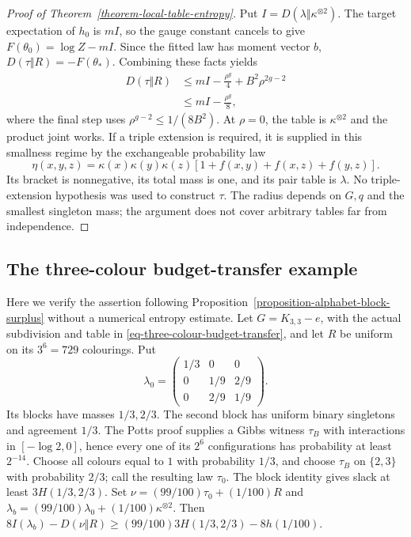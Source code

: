 \documentclass[a4paper,11pt,reqno]{amsart}
\theoremstyle{plain}
\theoremstyle{definition}
\theoremstyle{remark}
\begin{document}
\begin{proof}[Proof of Theorem~\ref{theorem-local-table-entropy}]
Put $I=D(\lambda\Vert\kappa^{\otimes2})$.
The target expectation of $h_0$ is $mI$, so the gauge constant cancels to
give $F(\theta_0)=\log Z-mI$.  Since the fitted law has moment vector $b$,
$D(\tau\Vert R)=-F(\theta_*)$.  Combining these facts yields
\[
 \begin{split}
 D(\tau\Vert R)
 &\le mI-\frac{\rho^g}{4}+B^2\rho^{2g-2}\\
 &\le mI-\frac{\rho^g}{8},
 \end{split}
\]
where the final step uses $\rho^{g-2}\le1/(8B^2)$.
At $\rho=0$, the table is $\kappa^{\otimes2}$ and the product joint works.
If a triple extension is required, it is supplied in this smallness regime
by the exchangeable probability law
\[
 \eta(x,y,z)=\kappa(x)\kappa(y)\kappa(z)
          [1+f(x,y)+f(x,z)+f(y,z)].
\]
Its bracket is nonnegative, its total mass is one, and its pair table is
$\lambda$.  No triple-extension hypothesis was used to construct $\tau$.
The radius depends on $G,q$ and the smallest singleton mass; the argument
does not cover arbitrary tables far from independence.
\end{proof}

\subsection*{The three-colour budget-transfer example}
Here we verify the assertion following
Proposition~\ref{proposition-alphabet-block-surplus} without a numerical
entropy estimate.  Let $G=K_{3,3}-e$, with the actual subdivision and table
in \eqref{eq-three-colour-budget-transfer}, and let $R$ be uniform on its
$3^6=729$ colourings.  Put
\[
 \lambda_0=\begin{pmatrix}1/3&0&0\\0&1/9&2/9\\0&2/9&1/9\end{pmatrix}.
\]
Its blocks have masses $1/3,2/3$.  The second block has uniform binary
singletons and agreement $1/3$.  The Potts proof supplies a Gibbs witness
$\tau_B$ with interactions in $[-\log2,0]$, hence every one of its
$2^6$ configurations has probability at least $2^{-14}$.
Choose all colours equal to $1$ with probability $1/3$, and choose
$\tau_B$ on $\{2,3\}$ with probability $2/3$; call the resulting law
$\tau_0$.  The block identity gives slack at least
$3H(1/3,2/3)$.  Set $\nu=(99/100)\tau_0+(1/100)R$ and
$\lambda_b=(99/100)\lambda_0+(1/100)\kappa^{\otimes2}$.
Then $8I(\lambda_b)-D(\nu\Vert R)\ge
(99/100)3H(1/3,2/3)-8h(1/100)$.
\end{document}
